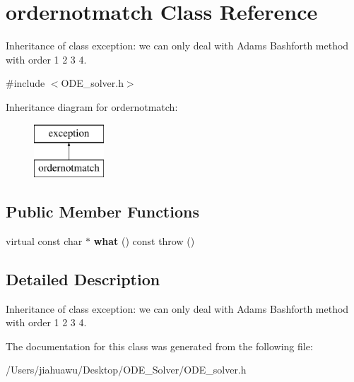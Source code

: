 \hypertarget{classordernotmatch}{}\section{ordernotmatch Class Reference}
\label{classordernotmatch}


Inheritance of class exception\+: we can only deal with Adams Bashforth method with order 1 2 3 4.  




{\ttfamily \#include $<$O\+D\+E\+\_\+solver.\+h$>$}

Inheritance diagram for ordernotmatch\+:\begin{figure}[H]
\begin{center}
\leavevmode
\includegraphics[height=2.000000cm]{classordernotmatch}
\end{center}
\end{figure}
\subsection*{Public Member Functions}
\begin{DoxyCompactItemize}
\item 
\mbox{\label{classordernotmatch_a3cd5dc7766d282739bcaa67a544b42cb}} 
virtual const char $\ast$ {\bfseries what} () const  throw ()
\end{DoxyCompactItemize}


\subsection{Detailed Description}
Inheritance of class exception\+: we can only deal with Adams Bashforth method with order 1 2 3 4. 

The documentation for this class was generated from the following file\+:\begin{DoxyCompactItemize}
\item 
/\+Users/jiahuawu/\+Desktop/\+O\+D\+E\+\_\+\+Solver/O\+D\+E\+\_\+solver.\+h\end{DoxyCompactItemize}
